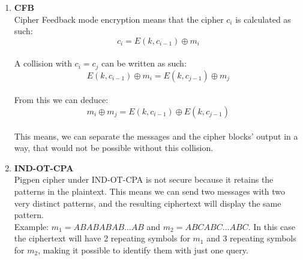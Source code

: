 \documentclass{article}
\begin{document}
\begin{enumerate}[label=\textbf{Task \arabic*:}]
		\item \textbf{CFB}\\
		Cipher Feedback mode encryption means that the cipher $c_i$ is calculated as such:
		\[c_i = E(k, c_{i-1}) \oplus m_i\] \\
		A collision with $c_i = c_j$ can be written as such:\\
		\[E(k, c_{i-1}) \oplus m_i =  E(k, c_{j-1}) \oplus m_j \]\\
		From this we can deduce:\\
		\[m_i \oplus m_j = E(k, c_{i-1}) \oplus E(k, c_{j-1})\]\\
		This means, we can separate the messages and the cipher blocks' output in a way, that would not be possible without this collision.
		\item \textbf{IND-OT-CPA} \\
		Pigpen cipher under IND-OT-CPA is not secure because it retains the patterns in the plaintext. This means we can send two messages with two very distinct patterns, and the resulting ciphertext will display the same pattern.\\
		Example: $m_1 = ABABABAB \dots AB$ and $m_2 = ABCABC \dots ABC$. In this case the ciphertext will have 2 repeating symbols for $m_1$ and 3 repeating symbols for $m_2$, making it possible to identify them with just one query.
		
	\end{enumerate}
	
\end{document}
